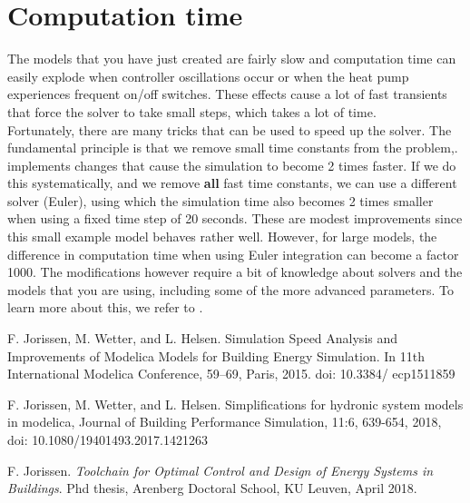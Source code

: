 \documentclass[10pt,a4paper]{article}
\begin{document}
\section{Computation time}
The models that you have just created are fairly slow
and computation time can easily explode when controller
oscillations occur or when the heat pump experiences frequent on/off switches. 
These effects cause a lot
of fast transients that force the solver to take small steps, 
which takes a lot of time.\\

Fortunately, there are many tricks that can be used to speed up the solver. 
The fundamental principle is that we remove small time constants from the problem,.
 implements changes that
cause the simulation to become 2 times faster.
If we do this systematically, and we remove \textbf{all} fast time constants,
we can use a different solver (Euler), 
using which the simulation time also becomes 2 times smaller
when using a fixed time step of 20 seconds.
These are modest improvements since this small example model behaves rather well.
However, for large models, the difference in computation time 
when using Euler integration can become a factor 1000.
The modifications however require a bit of knowledge about solvers 
and the models that you are using, including some of the more advanced parameters.
To learn more about this, we refer to \cite{Jorissen2015,Jorissen2018,phd}.

\begin{thebibliography}{9}
F. Jorissen, M. Wetter, and L. Helsen. Simulation Speed Analysis and Improvements of Modelica Models for Building Energy Simulation. In 11th International Modelica Conference, 59–69, Paris, 2015. doi: 10.3384/ ecp1511859

F. Jorissen, M. Wetter, and L. Helsen. Simplifications for hydronic system models in modelica, Journal of Building Performance Simulation, 11:6, 639-654, 2018, doi: 10.1080/19401493.2017.1421263

F. Jorissen. \textit{Toolchain for Optimal Control and Design of Energy Systems in Buildings}. Phd thesis, Arenberg Doctoral School, KU Leuven, April 2018.

\end{thebibliography}
\end{document}
